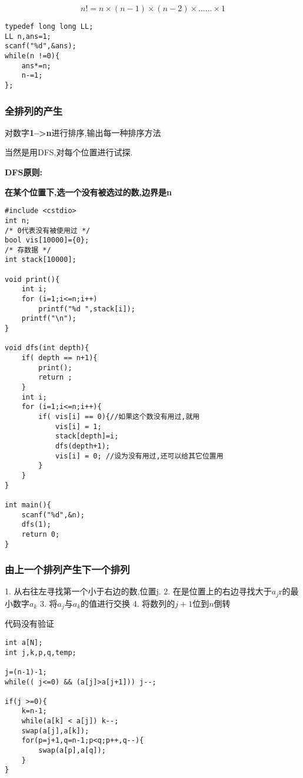$$
n!=n \times (n-1) \times (n-2) \times ......\times 1
$$

\begin{lstlisting}
typedef long long LL;
LL n,ans=1;
scanf("%d",&ans);
while(n !=0){
    ans*=n;
    n-=1;
};
\end{lstlisting}



\subsubsection{全排列的产生}

对数字\textbf{1-->n}进行排序,输出每一种排序方法

当然是用DFS,对每个位置进行试探.

\textbf{DFS原则:}

\textbf{在某个位置下,选一个没有被选过的数,边界是n}

\begin{lstlisting}
#include <cstdio>
int n;
/* 0代表没有被使用过 */
bool vis[10000]={0}; 
/* 存数据 */
int stack[10000];

void print(){
    int i;
    for (i=1;i<=n;i++)
        printf("%d ",stack[i]);
    printf("\n");
}

void dfs(int depth){
    if( depth == n+1){
        print();
        return ;
    }
    int i;
    for (i=1;i<=n;i++){
        if( vis[i] == 0){//如果这个数没有用过,就用
            vis[i] = 1;
            stack[depth]=i;
			dfs(depth+1);
            vis[i] = 0; //设为没有用过,还可以给其它位置用
        }
    }
}

int main(){
    scanf("%d",&n);
    dfs(1);
	return 0;
}
\end{lstlisting}

\subsubsection{由上一个排列产生下一个排列}

1. 从右往左寻找第一个小于右边的数,位置j.
2. 在是位置上的右边寻找大于$a_j$r的最小数字$a_k$
3. 将$a_j$与$a_k$的值进行交换
4. 将数列的$j+1$位到$n$倒转

代码没有验证

\begin{lstlisting}
int a[N];
int j,k,p,q,temp;

j=(n-1)-1;
while(( j<=0) && (a[j]>a[j+1])) j--;

if(j >=0){
    k=n-1;
    while(a[k] < a[j]) k--;
    swap(a[j],a[k]);
    for(p=j+1,q=n-1;p<q;p++,q--){
        swap(a[p],a[q]);
    }
}
\end{lstlisting}
